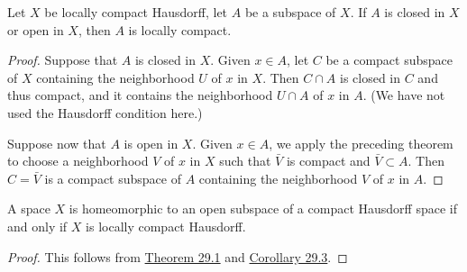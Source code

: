 \begin{corollary}
\label{cor:\thetheorem}
 Let \(X\) be locally compact Hausdorff, let \(A\) be a subspace of \(X\). If \(A\) is closed in \(X\) or open in \(X\), then \(A\) is locally compact.
\end{corollary}

\begin{proof}
Suppose that \(A\) is closed in \(X\). Given \(x \in A\), let \(C\) be a compact subspace of \(X\) containing the neighborhood \(U\) of \(x\) in \(X\). Then \(C \cap A\) is closed in \(C\) and thus compact, and it contains the neighborhood \(U \cap A\) of \(x\) in \(A\). (We have not used the Hausdorff condition here.)

Suppose now that \(A\) is open in \(X\). Given \(x \in A\), we apply the preceding theorem to choose a neighborhood \(V\) of \(x\) in \(X\) such that \(\bar{V}\) is compact and \(\bar{V} \subset A\). Then \(C = \bar{V}\) is a compact subspace of \(A\) containing the neighborhood \(V\) of \(x\) in \(A\).
\end{proof}

\begin{corollary}
\label{cor:\thetheorem}
 A space \(X\) is homeomorphic to an open subspace of a compact Hausdorff space if and only if \(X\) is locally compact Hausdorff.
\end{corollary}

\begin{proof}
This follows from \hyperref[thm:29.1]{Theorem 29.1} and \hyperref[cor:29.3]{Corollary 29.3}.
\end{proof}

